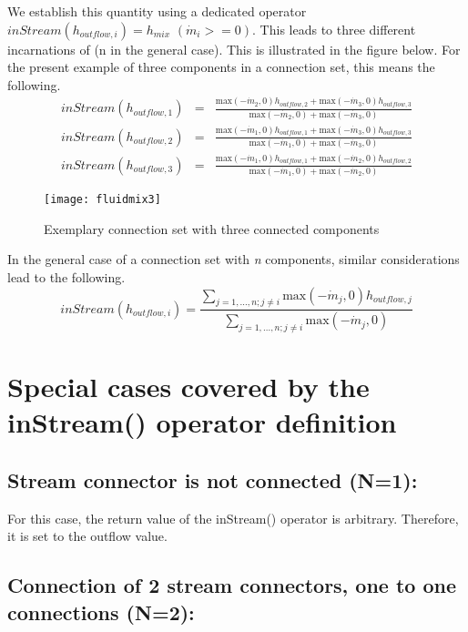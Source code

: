We establish this quantity using a dedicated operator $inStream(h_{outflow,i})=h_{mix}$ $(\dot{m}_{i} >= 0)$. This leads to
three different incarnations of (n in the general case). This is
illustrated in the figure below. For the present example of three
components in a connection set, this means the following.
\begin{eqnarray*}
inStream(h_{outflow,1})&=&\frac{\text{max}(-\dot{m}_2,0)h_{outflow,2}+\text{max}(-\dot{m}_3,0)h_{outflow,3}}{\text{max}(-\dot{m}_2,0)+\text{max}(-\dot{m}_3,0)}\\
inStream(h_{outflow,2})&=&\frac{\text{max}(-\dot{m}_1,0)h_{outflow,1}+\text{max}(-\dot{m}_3,0)h_{outflow,3}}{\text{max}(-\dot{m}_1,0)+\text{max}(-\dot{m}_3,0)}\\
inStream(h_{outflow,3})&=&\frac{\text{max}(-\dot{m}_1,0)h_{outflow,1}+\text{max}(-\dot{m}_2,0)h_{outflow,2}}{\text{max}(-\dot{m}_1,0)+\text{max}(-\dot{m}_2,0)}
\end{eqnarray*}
\begin{figure}[H]
\caption{Exemplary connection set with three connected components}
\begin{center}
\texttt{[image: fluidmix3]}
\end{center}
\end{figure}

In the general case of a connection set with \emph{n} components,
similar considerations lead to the following.
\begin{equation*}
inStream(h_{outflow,i})=\frac{\sum_{j=1,...,n;j\neq i}\text{max}(-\dot{m}_j,0)h_{outflow,j}}{\sum_{j=1,...,n;j\neq i}\text{max}(-\dot{m}_j,0)}
\end{equation*}

\section{Special cases covered by the inStream() operator definition}
\subsection{Stream connector is not connected (N=1):}
For this case, the return value of the inStream() operator is arbitrary.
Therefore, it is set to the outflow value.

\subsection{Connection of 2 stream connectors, one to one connections (N=2):}

